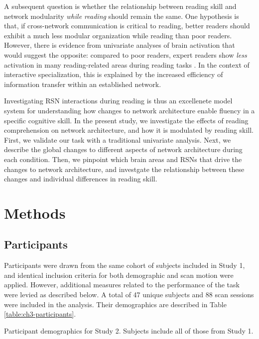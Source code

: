 A subsequent question is whether the relationship between reading skill and network modularity \textit{while reading} should remain the same. One hypothesis is that, if cross-network communication is critical to reading, better readers should exhibit a much less modular organization while reading than poor readers. However, there is evidence from univariate analyses of brain activation that would suggest the opposite: compared to poor readers, expert readers show \textit{less} activation in many reading-related areas during reading tasks \citep{...}.  In the context of interactive specialization, this is explained by the increased efficiency of information transfer within an established network. 

Investigating RSN interactions during reading is thus an excellenete model system for understanding how changes to network architecture enable fluency in a specific cognitive skill. In the present study, we investigate the effects of reading comprehension on network architecture, and how it is modulated by reading skill. First, we validate our task with a traditional univariate analysis. Next, we describe the global changes to different aspects of network architecture during each condition. Then, we pinpoint which brain areas and RSNs that drive the changes to network architecture, and investgate the relationship between these changes and individual differences in reading skill. 


\section{Methods}

\subsection{Participants}

Participants were drawn from the same cohort of subjects included in Study 1, and identical inclusion criteria for both demographic and scan motion were applied. However, additional measures related to the performance of the task were levied as described below. A total of 47 unique subjects and 88 scan sessions were included in the analysis. Their demographics are described in Table \ref{table:ch3-participants}.

\begin{table}
	\renewcommand{\tabcolsep}{0.09cm}
	\centering
	
	\caption[Participant demographics for Study 2.]{Participant demographics for Study 2. Subjects include all of those from Study 1.}
	\label{table:ch3-participants}
\end{table}


